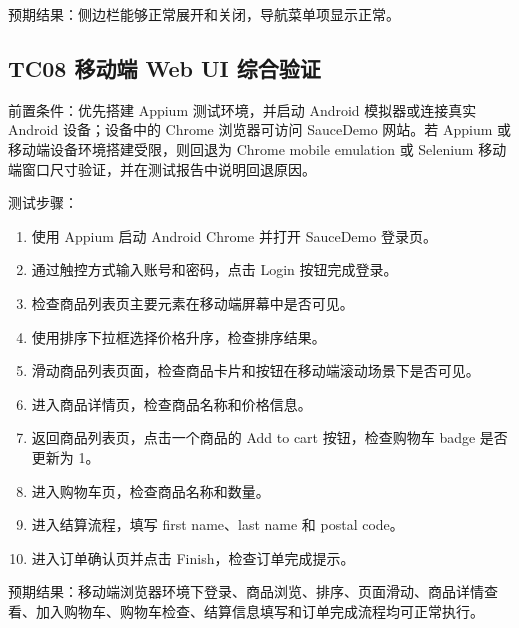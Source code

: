 \documentclass[UTF8,a4paper,12pt]{ctexart}
\begin{document}
预期结果：侧边栏能够正常展开和关闭，导航菜单项显示正常。

\subsection{TC08 移动端 Web UI 综合验证}

前置条件：优先搭建 Appium 测试环境，并启动 Android 模拟器或连接真实 Android 设备；设备中的 Chrome 浏览器可访问 SauceDemo 网站。若 Appium 或移动端设备环境搭建受限，则回退为 Chrome mobile emulation 或 Selenium 移动端窗口尺寸验证，并在测试报告中说明回退原因。

测试步骤：

\begin{enumerate}
  \item 使用 Appium 启动 Android Chrome 并打开 SauceDemo 登录页。
  \item 通过触控方式输入账号和密码，点击 Login 按钮完成登录。
  \item 检查商品列表页主要元素在移动端屏幕中是否可见。
  \item 使用排序下拉框选择价格升序，检查排序结果。
  \item 滑动商品列表页面，检查商品卡片和按钮在移动端滚动场景下是否可见。
  \item 进入商品详情页，检查商品名称和价格信息。
  \item 返回商品列表页，点击一个商品的 Add to cart 按钮，检查购物车 badge 是否更新为 1。
  \item 进入购物车页，检查商品名称和数量。
  \item 进入结算流程，填写 first name、last name 和 postal code。
  \item 进入订单确认页并点击 Finish，检查订单完成提示。
\end{enumerate}

预期结果：移动端浏览器环境下登录、商品浏览、排序、页面滑动、商品详情查看、加入购物车、购物车检查、结算信息填写和订单完成流程均可正常执行。
\end{document}
